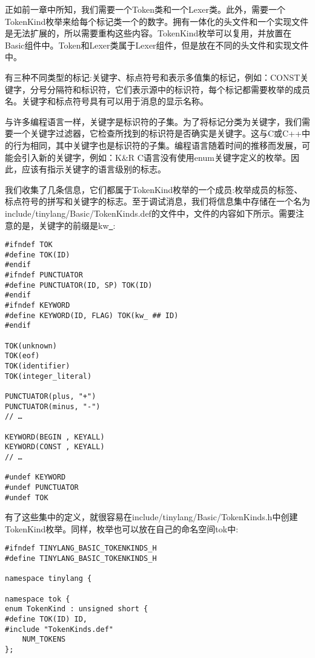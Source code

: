 正如前一章中所知，我们需要一个Token类和一个Lexer类。此外，需要一个TokenKind枚举来给每个标记类一个的数字。拥有一体化的头文件和一个实现文件是无法扩展的，所以需要重构这些内容。TokenKind枚举可以复用，并放置在Basic组件中。Token和Lexer类属于Lexer组件，但是放在不同的头文件和实现文件中。\par

有三种不同类型的标记:关键字、标点符号和表示多值集的标记，例如：CONST关键字，分号分隔符和标识符，它们表示源中的标识符，每个标记都需要枚举的成员名。关键字和标点符号具有可以用于消息的显示名称。\par

与许多编程语言一样，关键字是标识符的子集。为了将标记分类为关键字，我们需要一个关键字过滤器，它检查所找到的标识符是否确实是关键字。这与C或C++中的行为相同，其中关键字也是标识符的子集。编程语言随着时间的推移而发展，可能会引入新的关键字，例如：K\&R C语言没有使用enum关键字定义的枚举。因此，应该有指示关键字的语言级别的标志。\par

我们收集了几条信息，它们都属于TokenKind枚举的一个成员:枚举成员的标签、标点符号的拼写和关键字的标志。至于调试消息，我们将信息集中存储在一个名为include/tinylang/Basic/Token\allowbreak Kinds.def的文件中，文件的内容如下所示。需要注意的是，关键字的前缀是kw\underline{~}:\par

\begin{lstlisting}[caption={}]
#ifndef TOK
#define TOK(ID)
#endif
#ifndef PUNCTUATOR
#define PUNCTUATOR(ID, SP) TOK(ID)
#endif
#ifndef KEYWORD
#define KEYWORD(ID, FLAG) TOK(kw_ ## ID)
#endif

TOK(unknown)
TOK(eof)
TOK(identifier)
TOK(integer_literal)

PUNCTUATOR(plus, "+")
PUNCTUATOR(minus, "-")
// …

KEYWORD(BEGIN , KEYALL)
KEYWORD(CONST , KEYALL)
// …

#undef KEYWORD
#undef PUNCTUATOR
#undef TOK
\end{lstlisting}

有了这些集中的定义，就很容易在include/tinylang/Basic/TokenKinds.h中创建TokenKind枚举。同样，枚举也可以放在自己的命名空间tok中:\par

\begin{lstlisting}[caption={}]
#ifndef TINYLANG_BASIC_TOKENKINDS_H
#define TINYLANG_BASIC_TOKENKINDS_H

namespace tinylang {
	
namespace tok {
enum TokenKind : unsigned short {
#define TOK(ID) ID,
#include "TokenKinds.def"
	NUM_TOKENS
};
\end{lstlisting}

